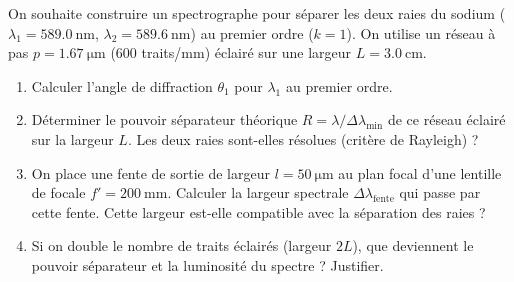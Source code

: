 \documentclass[11pt]{article}
\begin{document}
\begin{exercice}
On souhaite construire un spectrographe pour séparer les deux raies du sodium ($\lambda_1 = \SI{589,0}{\nano\meter}$, $\lambda_2 = \SI{589,6}{\nano\meter}$) au premier ordre ($k=1$). On utilise un réseau à pas $p = \SI{1,67}{\micro\meter}$ (600 traits/mm) éclairé sur une largeur $L = \SI{3,0}{\centi\meter}$.
\begin{enumerate}
    \item Calculer l'angle de diffraction $\theta_1$ pour $\lambda_1$ au premier ordre.
    \item Déterminer le pouvoir séparateur théorique $R = \lambda / \Delta\lambda_{\min}$ de ce réseau éclairé sur la largeur $L$. Les deux raies sont-elles résolues (critère de Rayleigh) ?
    \item On place une fente de sortie de largeur $l = \SI{50}{\micro\meter}$ au plan focal d'une lentille de focale $f' = \SI{200}{\milli\meter}$. Calculer la largeur spectrale $\Delta\lambda_{\text{fente}}$ qui passe par cette fente. Cette largeur est-elle compatible avec la séparation des raies ?
    \item Si on double le nombre de traits éclairés (largeur $2L$), que deviennent le pouvoir séparateur et la luminosité du spectre ? Justifier.
\end{enumerate}
\end{exercice}
\end{document}
